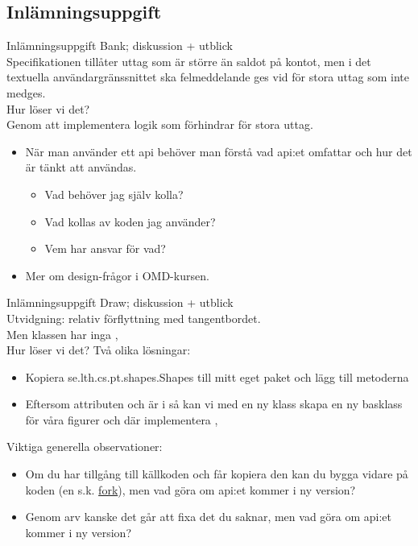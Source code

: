 \documentclass{lecturenotes}
\begin{document}
\subsection{Inlämningsuppgift}
\begin{Slide}{Inlämningsuppgift Bank; diskussion + utblick}
 \\
Specifikationen tillåter uttag som är större än saldot på kontot, men i det textuella användargränssnittet ska felmeddelande ges vid för stora uttag som inte medges. \\ 
\vspace {1em} Hur löser vi det? \\
\pause Genom att implementera logik som förhindrar för stora uttag.
 \\ \vspace {1em} 
 \pause
\begin{itemize}
\item När man använder ett api behöver man förstå vad api:et omfattar och hur det är tänkt att användas. 
\begin{itemize}
\item Vad behöver jag själv kolla? 
\item Vad kollas av koden jag använder? 
\item Vem har ansvar för vad?
\end{itemize}
\item Mer om design-frågor i OMD-kursen.
\end{itemize}
\end{Slide}

\begin{Slide}{Inlämningsuppgift Draw; diskussion + utblick}\footnotesize
{} \\
Utvidgning: relativ förflyttning med tangentbordet. \\Men klassen  har inga , \\ 
\vspace {1em} Hur löser vi det? 
\pause Två olika lösningar:
\begin{itemize}\footnotesize
\item Kopiera  se.lth.cs.pt.shapes.Shapes till mitt eget paket och lägg till metoderna
\item Eftersom attributen  och  är  i  så kan vi med en ny klass  skapa en ny basklass för våra figurer och där implementera  , 
\end{itemize}
 \pause \vspace{1em} Viktiga generella observationer:
\begin{itemize}\footnotesize
\item Om du har tillgång till källkoden och får kopiera den kan du bygga vidare på koden (en s.k. \href{https://sv.wikipedia.org/wiki/Fork}{fork}), men vad göra om api:et kommer i ny version? 
\item Genom arv kanske det går att fixa det du saknar, men vad göra om api:et kommer i ny version?
\end{itemize}
\end{Slide}
\end{document}
